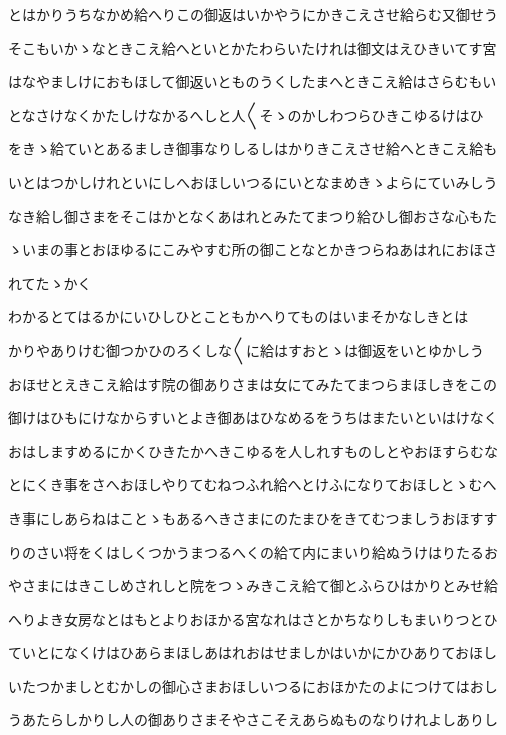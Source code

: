 \documentclass[a4paper,11pt,landscape]{ltjtarticle}
\begin{document}
とはかりうちなかめ給へりこの御返はいかやうにかきこえさせ給らむ又御せう
\par\medskip
そこもいかゝなときこえ給へといとかたわらいたけれは御文はえひきいてす宮
\par\medskip
はなやましけにおもほして御返いとものうくしたまへときこえ給はさらむもい
\par\medskip
となさけなくかたしけなかるへしと人〱そゝのかしわつらひきこゆるけはひ
\par\medskip
をきゝ給ていとあるましき御事なりしるしはかりきこえさせ給へときこえ給も
\par\medskip
いとはつかしけれといにしへおほしいつるにいとなまめきゝよらにていみしう
\par\medskip
なき給し御さまをそこはかとなくあはれとみたてまつり給ひし御おさな心もた
\par\medskip
ゝいまの事とおほゆるにこみやすむ所の御ことなとかきつらねあはれにおほさ
\par\medskip
れてたゝかく
\par\medskip
わかるとてはるかにいひしひとこともかへりてものはいまそかなしきとは
\par\medskip
かりやありけむ御つかひのろくしな〱に給はすおとゝは御返をいとゆかしう
\par\medskip
おほせとえきこえ給はす院の御ありさまは女にてみたてまつらまほしきをこの
\par\medskip
御けはひもにけなからすいとよき御あはひなめるをうちはまたいといはけなく
\par\medskip
おはしますめるにかくひきたかへきこゆるを人しれすものしとやおほすらむな
\par\medskip
とにくき事をさへおほしやりてむねつふれ給へとけふになりておほしとゝむへ
\par\medskip
き事にしあらねはことゝもあるへきさまにのたまひをきてむつましうおほすす
\par\medskip
りのさい将をくはしくつかうまつるへくの給て内にまいり給ぬうけはりたるお
\par\medskip
やさまにはきこしめされしと院をつゝみきこえ給て御とふらひはかりとみせ給
\par\medskip
へりよき女房なとはもとよりおほかる宮なれはさとかちなりしもまいりつとひ
\par\medskip
ていとになくけはひあらまほしあはれおはせましかはいかにかひありておほし
\par\medskip
いたつかましとむかしの御心さまおほしいつるにおほかたのよにつけてはおし
\par\medskip
うあたらしかりし人の御ありさまそやさこそえあらぬものなりけれよしありし
\end{document}
